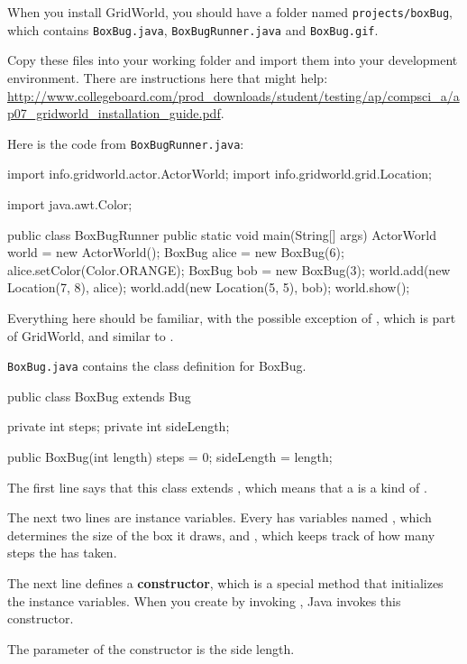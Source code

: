 When you install GridWorld, you should have a folder named {\tt projects/boxBug}, which contains {\tt BoxBug.java}, {\tt BoxBugRunner.java} and {\tt BoxBug.gif}.

Copy these files into your working folder and import them into your development environment.
There are instructions here that might help:
\url{http://www.collegeboard.com/prod_downloads/student/testing/ap/compsci_a/ap07_gridworld_installation_guide.pdf}.

Here is the code from {\tt BoxBugRunner.java}:

\begin{code}
import info.gridworld.actor.ActorWorld;
import info.gridworld.grid.Location;

import java.awt.Color;

public class BoxBugRunner {
    public static void main(String[] args) {
        ActorWorld world = new ActorWorld();
        BoxBug alice = new BoxBug(6);
        alice.setColor(Color.ORANGE);
        BoxBug bob = new BoxBug(3);
        world.add(new Location(7, 8), alice);
        world.add(new Location(5, 5), bob);
        world.show();
    }
}
\end{code}

Everything here should be familiar, with the possible exception of , which is part of GridWorld, and similar to .

{\tt BoxBug.java} contains the class definition for BoxBug.

\begin{code}
public class BoxBug extends Bug {
    private int steps;
    private int sideLength;

    public BoxBug(int length) {
        steps = 0;
        sideLength = length;
    }
}
\end{code}

The first line says that this class extends , which means that a  is a kind of .

The next two lines are instance variables.
Every  has variables named , which determines the size of the box it draws, and , which keeps track of how many steps the  has taken.

The next line defines a {\bf constructor}, which is a special method that initializes the instance variables.
When you create  by invoking , Java invokes this constructor.

The parameter of the constructor is the side length.

